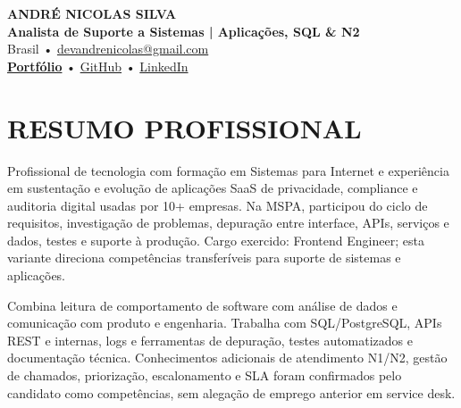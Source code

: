 \documentclass[10pt,a4paper]{article}
\begin{document}

\begin{center}

    {\LARGE \textbf{ANDRÉ NICOLAS SILVA}} \\[-2pt]

    {\normalsize \textbf{Analista de Suporte a Sistemas | Aplicações, SQL \& N2}} \\[1pt]

    \footnotesize
    Brasil \quad • \quad
    \href{mailto:devandrenicolas@gmail.com}{devandrenicolas@gmail.com} \\[-1pt]

    \textbf{\href{https://portfolio-andrenicolas.vercel.app}{Portfólio}}
    \quad • \quad
    \href{https://github.com/devAndreNicolas}{GitHub}
    \quad • \quad
    \href{https://www.linkedin.com/in/devandrenicolas}{LinkedIn}

\end{center}

\vspace{-3pt}


\section*{RESUMO PROFISSIONAL}

\footnotesize

Profissional de tecnologia com formação em Sistemas para Internet e experiência em sustentação e evolução de aplicações SaaS de privacidade, compliance e auditoria digital usadas por 10+ empresas. Na MSPA, participou do ciclo de requisitos, investigação de problemas, depuração entre interface, APIs, serviços e dados, testes e suporte à produção. Cargo exercido: Frontend Engineer; esta variante direciona competências transferíveis para suporte de sistemas e aplicações.

Combina leitura de comportamento de software com análise de dados e comunicação com produto e engenharia. Trabalha com SQL/PostgreSQL, APIs REST e internas, logs e ferramentas de depuração, testes automatizados e documentação técnica. Conhecimentos adicionais de atendimento N1/N2, gestão de chamados, priorização, escalonamento e SLA foram confirmados pelo candidato como competências, sem alegação de emprego anterior em service desk.
\end{document}
